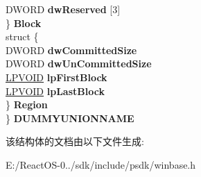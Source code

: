 \begin{DoxyCompactItemize}
\begin{tabbing}
\>\>DWORD {\bfseries dwReserved} \mbox{[}3\mbox{]}\\
\>\} {\bfseries Block}\\
\>struct \{\\
\>\>DWORD {\bfseries dwCommittedSize}\\
\>\>DWORD {\bfseries dwUnCommittedSize}\\
\>\>\hyperlink{interfacevoid}{LPVOID} {\bfseries lpFirstBlock}\\
\>\>\hyperlink{interfacevoid}{LPVOID} {\bfseries lpLastBlock}\\
\>\} {\bfseries Region}\\
\} {\bfseries DUMMYUNIONNAME}\\

\end{tabbing}\end{DoxyCompactItemize}


该结构体的文档由以下文件生成\+:\begin{DoxyCompactItemize}
\item 
E\+:/\+React\+O\+S-\/0../sdk/include/psdk/winbase.\+h\end{DoxyCompactItemize}
